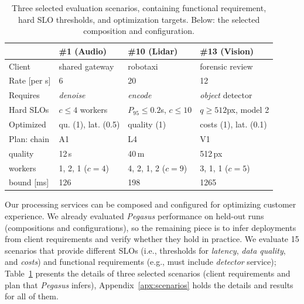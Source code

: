 \begin{table}[t]
    \centering
    \caption{Three selected evaluation scenarios, containing functional requirement, hard SLO thresholds, and optimization targets. Below: the selected composition and configuration.}
    \label{tab:scenarios}
    \footnotesize
    \setlength{\tabcolsep}{3pt}
    \begin{tabular}{llll}
        \toprule
        & \#1 (Audio) & \#10 (Lidar) & \#13 (Vision) \\
        \midrule
        Client & shared gateway & robotaxi & forensic review \\
        Rate [per s] & 6 & 20 & 12 \\
        Requires & \textit{denoise} & \textit{encode} & \textit{object} detector \\
        Hard SLOs & $c \leq 4$ workers & $P_{95} \leq 0.2$s, $c \leq 10$ & $q \geq 512$px, model 2 \\
        Optimized & qu. (1), lat. (0.5) & quality (1) & costs (1), lat. (0.1) \\
        \midrule
        Plan: chain & A1 & L4 & V1 \\
        quality & 12\,s & 40\,m & 512\,px \\
        workers & 1, 2, 1 ($c=4$) & 4, 2, 1, 2 ($c=9$) & 3, 1, 1 ($c=5$) \\
        bound [ms] & 126 & 198 & 1265 \\
        \bottomrule
    \end{tabular}
\end{table}

Our processing services can be composed and configured for optimizing customer experience. We already evaluated \textit{Pegasus} performance on held-out runs (compositions and configurations), so the remaining piece is to infer deployments from client requirements and verify whether they hold in practice.
%
We evaluate 15 scenarios that provide different SLOs (i.e., thresholds for \textit{latency}, \textit{data quality}, and \textit{costs}) and functional requirements (e.g., must include \textit{detector} service); Table~\ref{tab:scenarios} presents the details of three selected scenarios (client requirements and plan that \textit{Pegasus} infers), Appendix~\ref{apx:scenarios} holds the details and results for all of them.


